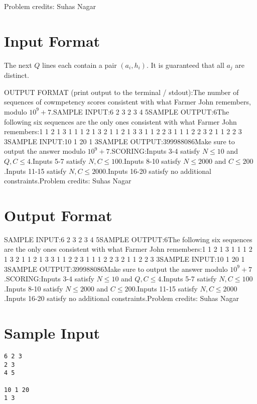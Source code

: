 \documentclass[12pt]{article}
\begin{document}
Problem credits: Suhas Nagar



\section*{Input Format}
The next $Q$ lines each contain a pair $(a_i, h_i)$. It is guaranteed that all
$a_j$ are distinct.

OUTPUT FORMAT (print output to the terminal / stdout):The number of sequences of cowmpetency scores consistent with what Farmer John
remembers, modulo $10^9+7$.SAMPLE INPUT:6 2 3
2 3
4 5SAMPLE OUTPUT:6The following six sequences are the only ones consistent with what Farmer John
remembers:1 1 2 1 3 1
1 1 2 1 3 2
1 1 2 1 3 3
1 1 2 2 3 1
1 1 2 2 3 2
1 1 2 2 3 3SAMPLE INPUT:10 1 20
1 3SAMPLE OUTPUT:399988086Make sure to output the answer modulo $10^9+7$.SCORING:Inputs 3-4 satisfy $N \leq 10$ and $Q, C \leq 4$.Inputs 5-7
satisfy $N, C \leq 100$.Inputs 8-10 satisfy $N \leq 2000$ and
$C \leq 200$.Inputs 11-15 satisfy $N, C \leq 2000$.Inputs
16-20 satisfy no additional constraints.Problem credits: Suhas Nagar

\section*{Output Format}
SAMPLE INPUT:6 2 3
2 3
4 5SAMPLE OUTPUT:6The following six sequences are the only ones consistent with what Farmer John
remembers:1 1 2 1 3 1
1 1 2 1 3 2
1 1 2 1 3 3
1 1 2 2 3 1
1 1 2 2 3 2
1 1 2 2 3 3SAMPLE INPUT:10 1 20
1 3SAMPLE OUTPUT:399988086Make sure to output the answer modulo $10^9+7$.SCORING:Inputs 3-4 satisfy $N \leq 10$ and $Q, C \leq 4$.Inputs 5-7
satisfy $N, C \leq 100$.Inputs 8-10 satisfy $N \leq 2000$ and
$C \leq 200$.Inputs 11-15 satisfy $N, C \leq 2000$.Inputs
16-20 satisfy no additional constraints.Problem credits: Suhas Nagar

\section*{Sample Input}
\begin{verbatim}
6 2 3
2 3
4 5

10 1 20
1 3
\end{verbatim}
\end{document}
